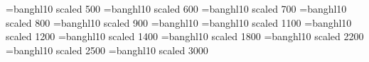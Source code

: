 \font\bnhv=banghl10 scaled 500
\font\bnhvi=banghl10 scaled 600
\font\bnhvii=banghl10 scaled 700
\font\bnhviii=banghl10 scaled 800
\font\bnhix=banghl10 scaled 900
\font\bnhx=banghl10
\font\bnhxi=banghl10 scaled 1100
\font\bnhxii=banghl10 scaled 1200
\font\bnhxiv=banghl10 scaled 1400
\font\bnhxviii=banghl10 scaled 1800
\font\bnhxxii=banghl10 scaled 2200
\font\bnhxxv=banghl10 scaled 2500
\font\bnhxxx=banghl10 scaled 3000


  

\def\*#1*#2{o\null{#2}{#1}}

\def\d#1{\oalign{\smash{#1}\crcr\hidewidth{$\!$\rm.}\hidewidth}}



\def\sh#1{\setbox0=\hbox{#1}%
     \kern-.02em\copy0\kern-\wd0
     \kern.04em\copy0\kern-\wd0
     \kern-.02em\raise.0433em\box0 }


